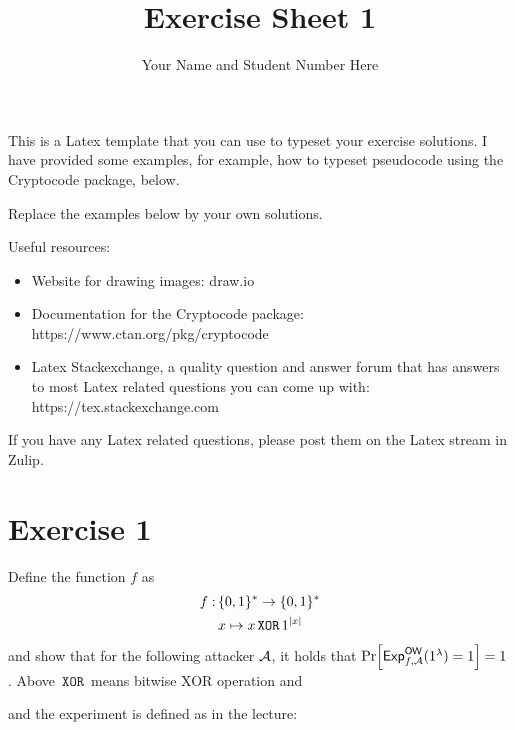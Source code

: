 \documentclass{article}      	%
\author{Your Name and Student Number Here}
\title{Exercise Sheet 1}
\newcommand{\xor}{\, \texttt{XOR} \,} %
\begin{document}
         
\maketitle

This is a Latex template that you can use to typeset your exercise solutions. I have provided some examples, for example, how to typeset pseudocode using the Cryptocode package, below.

Replace the examples below by your own solutions.

Useful resources:
\begin{itemize}
    \item Website for drawing images: draw.io
    \item Documentation for the Cryptocode package: https://www.ctan.org/pkg/cryptocode
    \item Latex Stackexchange, a quality question and answer forum that has answers to most Latex related questions you can come up with: https://tex.stackexchange.com
\end{itemize}


If you have any Latex related questions, please post them on the Latex stream in Zulip.

\section*{Exercise 1} 

Define the function $f$ as
\begin{align*}
    f:\, &\bin^* \rightarrow \bin^*\\
    & x \mapsto x\xor 1^{\abs{x}}
\end{align*}
and show that for the following attacker $\mathcal{A}$, it holds that
$\prob{\mathsf{Exp}_{f, \adv}^{\mathsf{OW}}(1^\lambda) = 1} = 1$.
Above $\xor$ means bitwise XOR operation and 

\begin{center}
    \begin{pchstack}
    \procedure{ $\adv(y, 1^{\abs{x}})$ }{ 
        z \leftarrow y \xor 1^{\abs{x}} \\
        \pcreturn z
    }
    \end{pchstack}
\end{center}

and the experiment is defined as in the lecture:
\begin{center}
\end{center}
\end{document}
